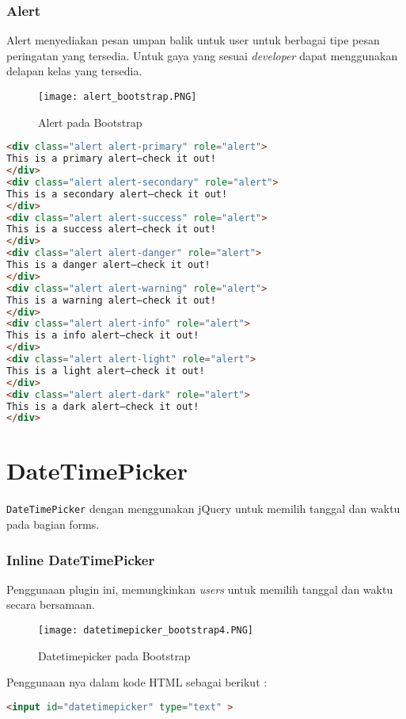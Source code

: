 \subsubsection{Alert}
Alert menyediakan pesan umpan balik untuk user untuk berbagai tipe pesan peringatan yang tersedia. Untuk gaya yang sesuai \textit{developer} dapat menggunakan delapan kelas yang tersedia.
\begin{figure} [H]
	\centering  
	\texttt{[image: alert\_bootstrap.PNG]}  
	\caption{Alert pada Bootstrap} 
	\label{fig:alertBootstrap}
\end{figure}
\begin{lstlisting}[language=HTML,  basicstyle=\ttfamily, frame=single, columns=fullflexible, keepspaces=true, breaklines=true, showstringspaces=false, label={lst:alertBootstrap}, caption=Alert pada bootstrap 4.] 
<div class="alert alert-primary" role="alert">
This is a primary alert—check it out!
</div>
<div class="alert alert-secondary" role="alert">
This is a secondary alert—check it out!
</div>
<div class="alert alert-success" role="alert">
This is a success alert—check it out!
</div>
<div class="alert alert-danger" role="alert">
This is a danger alert—check it out!
</div>
<div class="alert alert-warning" role="alert">
This is a warning alert—check it out!
</div>
<div class="alert alert-info" role="alert">
This is a info alert—check it out!
</div>
<div class="alert alert-light" role="alert">
This is a light alert—check it out!
</div>
<div class="alert alert-dark" role="alert">
This is a dark alert—check it out!
</div>
\end{lstlisting}

\section{DateTimePicker}
\texttt{DateTimePicker} dengan menggunakan jQuery untuk memilih tanggal dan waktu pada bagian forms. 
\subsubsection{Inline DateTimePicker}
Penggunaan plugin ini, memungkinkan \textit{users} untuk memilih tanggal dan waktu secara bersamaan.
\begin{figure} [H]
	\centering  
	\texttt{[image: datetimepicker\_bootstrap4.PNG]}  
	\caption{Datetimepicker pada Bootstrap} 
	\label{fig:datetimepickerBootstrap}
\end{figure}
\noindent 
Penggunaan nya dalam kode HTML sebagai berikut :
\begin{lstlisting}[language=HTML,  basicstyle=\ttfamily, frame=single, columns=fullflexible, keepspaces=true, breaklines=true, showstringspaces=false, label={lst:htmlPlugin}, caption=Kode HTML pada plugin.] 
<input id="datetimepicker" type="text" >
\end{lstlisting}

